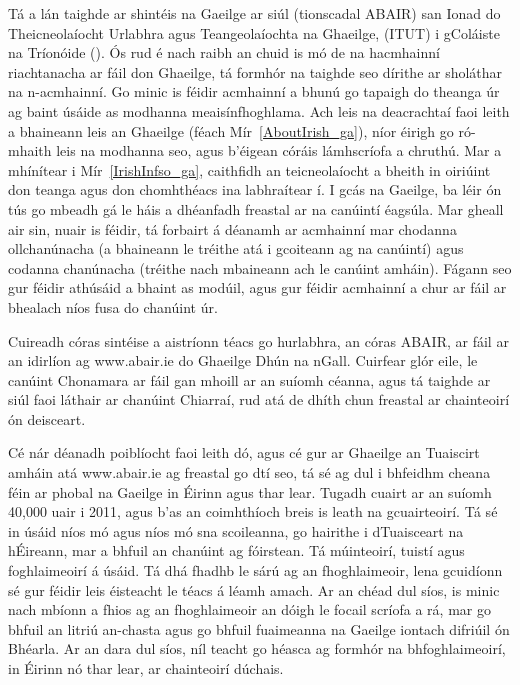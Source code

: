 \begin{multicols}{2}
Tá a lán taighde ar shintéis na Gaeilge ar siúl (tionscadal ABAIR) san Ionad do Theicneolaíocht Urlabhra agus Teangeolaíochta na Ghaeilge, (ITUT) i gColáiste na Tríonóide (\cite{pittsburgh}). Ós rud é nach raibh an chuid is mó de na hacmhainní riachtanacha ar fáil don Ghaeilge, tá formhór na taighde seo dírithe ar sholáthar na n-acmhainní. Go minic is féidir acmhainní a bhunú go tapaigh do theanga úr ag baint úsáide as modhanna meaisínfhoghlama. Ach leis na deacrachtaí faoi leith a bhaineann leis an Ghaeilge (féach Mír~\ref{AboutIrish_ga}), níor éirigh go ró-mhaith leis na modhanna seo, agus b’éigean córáis lámhscríofa a chruthú. Mar a mhínítear i Mír~\ref{IrishInfso_ga}, caithfidh an teicneolaíocht a bheith in oiriúint don teanga agus don chomhthéacs ina labhraítear í. I gcás na Gaeilge, ba léir ón tús go mbeadh gá le háis a dhéanfadh freastal ar na canúintí éagsúla. Mar gheall air sin, nuair is féidir, tá forbairt á déanamh ar acmhainní mar chodanna ollchanúnacha (a bhaineann le tréithe atá i gcoiteann ag na canúintí) agus codanna chanúnacha (tréithe nach mbaineann ach le canúint amháin). Fágann seo gur féidir athúsáid a bhaint as modúil, agus gur féidir acmhainní a chur ar fáil ar bhealach níos fusa do chanúint úr.

Cuireadh córas sintéise a aistríonn téacs go hurlabhra, an córas ABAIR, ar fáil ar an idirlíon ag www.abair.ie do Ghaeilge Dhún na nGall. Cuirfear glór eile, le canúint Chonamara ar fáil gan mhoill ar an suíomh céanna, agus tá taighde ar siúl faoi láthair ar chanúint Chiarraí, rud atá de dhíth chun freastal ar chainteoirí ón deisceart.

Cé nár déanadh poiblíocht faoi leith dó, agus cé gur ar Ghaeilge an Tuaiscirt amháin atá www.abair.ie ag freastal go dtí seo, tá sé ag dul i bhfeidhm cheana féin ar phobal na Gaeilge in Éirinn agus thar lear. Tugadh cuairt ar an suíomh 40,000 uair i 2011, agus b’as an coimhthíoch breis is leath na gcuairteoirí. Tá sé in úsáid níos mó agus níos mó sna scoileanna, go hairithe i dTuaisceart na hÉireann, mar a bhfuil an chanúint ag fóirstean. Tá múinteoirí, tuistí agus foghlaimeoirí á úsáid. Tá dhá fhadhb le sárú ag an fhoghlaimeoir, lena gcuidíonn sé gur féidir leis éisteacht le téacs á léamh amach. Ar an chéad dul síos, is minic nach mbíonn a fhios ag an fhoghlaimeoir an dóigh le focail scríofa a rá, mar go bhfuil an litriú an-chasta agus go bhfuil fuaimeanna na Gaeilge iontach difriúil ón Bhéarla. Ar an dara dul síos, níl teacht go héasca ag formhór na bhfoghlaimeoirí, in Éirinn nó thar lear, ar chainteoirí dúchais.


\end{multicols}
